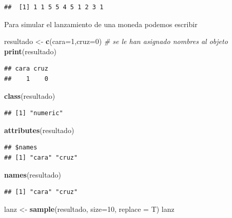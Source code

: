 \documentclass[]{book}
\newenvironment{Shaded}{\begin{snugshade}}{\end{snugshade}}
\newcommand{\KeywordTok}[1]{\textcolor[rgb]{0.13,0.29,0.53}{\textbf{#1}}}
\newcommand{\DataTypeTok}[1]{\textcolor[rgb]{0.13,0.29,0.53}{#1}}
\newcommand{\DecValTok}[1]{\textcolor[rgb]{0.00,0.00,0.81}{#1}}
\newcommand{\StringTok}[1]{\textcolor[rgb]{0.31,0.60,0.02}{#1}}
\newcommand{\CommentTok}[1]{\textcolor[rgb]{0.56,0.35,0.01}{\textit{#1}}}
\newcommand{\NormalTok}[1]{#1}
\begin{document}
\begin{verbatim}
##  [1] 1 1 5 5 4 5 1 2 3 1
\end{verbatim}

Para simular el lanzamiento de una moneda podemos escribir

\begin{Shaded}
\begin{Highlighting}[]
\NormalTok{resultado <-}\StringTok{ }\KeywordTok{c}\NormalTok{(}\DataTypeTok{cara=}\DecValTok{1}\NormalTok{,}\DataTypeTok{cruz=}\DecValTok{0}\NormalTok{) }\CommentTok{# se le han asignado nombres al objeto}
\KeywordTok{print}\NormalTok{(resultado)}
\end{Highlighting}
\end{Shaded}

\begin{verbatim}
## cara cruz 
##    1    0
\end{verbatim}

\begin{Shaded}
\begin{Highlighting}[]
\KeywordTok{class}\NormalTok{(resultado)}
\end{Highlighting}
\end{Shaded}

\begin{verbatim}
## [1] "numeric"
\end{verbatim}

\begin{Shaded}
\begin{Highlighting}[]
\KeywordTok{attributes}\NormalTok{(resultado)}
\end{Highlighting}
\end{Shaded}

\begin{verbatim}
## $names
## [1] "cara" "cruz"
\end{verbatim}

\begin{Shaded}
\begin{Highlighting}[]
\KeywordTok{names}\NormalTok{(resultado)}
\end{Highlighting}
\end{Shaded}

\begin{verbatim}
## [1] "cara" "cruz"
\end{verbatim}

\begin{Shaded}
\begin{Highlighting}[]
\NormalTok{lanz <-}\StringTok{ }\KeywordTok{sample}\NormalTok{(resultado, }\DataTypeTok{size=}\DecValTok{10}\NormalTok{, }\DataTypeTok{replace =}\NormalTok{ T)}
\NormalTok{lanz}
\end{Highlighting}
\end{Shaded}
\end{document}
